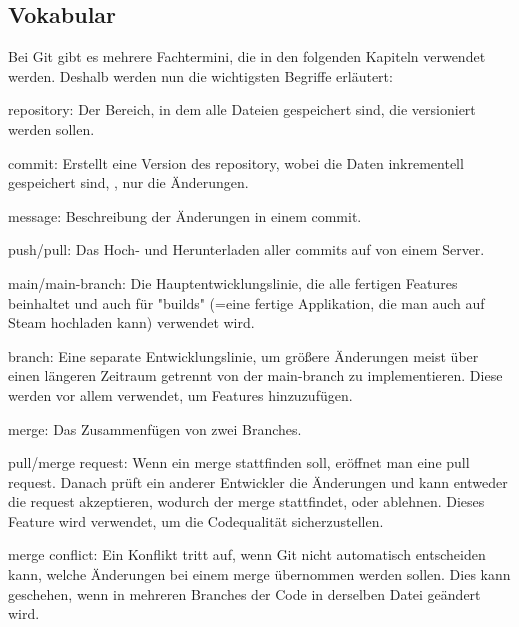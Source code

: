 \renewcommand{\kapitelautor}{Autor: Felix Zwickelstorfer}
\subsection{Vokabular}\label{subsec:git-vokabular}


\renewcommand{\kapitelautor}{Autor: Felix Zwickelstorfer}

Bei Git gibt es mehrere Fachtermini, die in den folgenden Kapiteln verwendet werden.
Deshalb werden nun die wichtigsten Begriffe erläutert:

\begin{liste}
    \item repository: Der Bereich, in dem alle Dateien gespeichert sind, die versioniert werden sollen.
    \item commit: Erstellt eine Version des repository, wobei die Daten inkrementell gespeichert sind, \dah, nur die Änderungen.
    \item message: Beschreibung der Änderungen in einem commit.
    \item push/pull: Das Hoch- und Herunterladen aller commits auf \bzw von einem Server.
    \item main/main-branch: Die Hauptentwicklungslinie, die alle fertigen Features beinhaltet und auch für "builds" (=eine fertige Applikation, die man auch auf Steam hochladen kann) verwendet wird.
    \item branch: Eine separate Entwicklungslinie, um größere Änderungen meist über einen längeren Zeitraum getrennt von der main-branch zu implementieren.
    Diese werden vor allem verwendet, um Features hinzuzufügen.
    \item merge: Das Zusammenfügen von zwei Branches.
    \item pull/merge request: Wenn ein merge stattfinden soll, eröffnet man eine pull request.
    Danach prüft ein anderer Entwickler die Änderungen und kann entweder die request akzeptieren, wodurch der merge stattfindet, oder ablehnen.
    Dieses Feature wird verwendet, um die Codequalität sicherzustellen.
    \item merge conflict: Ein Konflikt tritt auf, wenn Git nicht automatisch entscheiden kann, welche Änderungen bei einem merge übernommen werden sollen.
    Dies kann geschehen, wenn in mehreren Branches der Code in derselben Datei geändert wird.
\end{liste}
